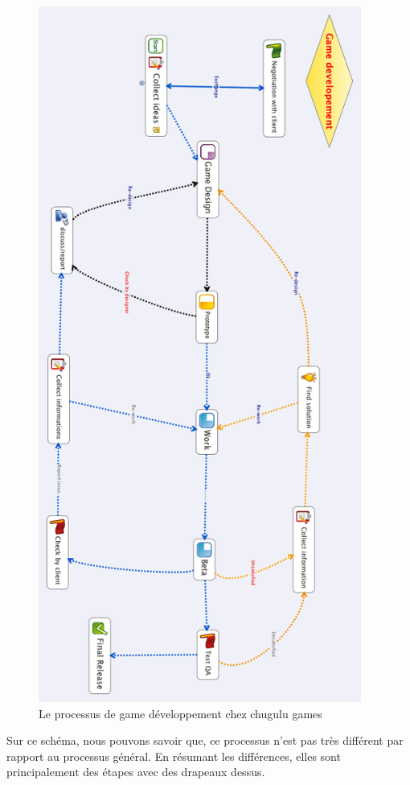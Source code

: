 \begin{figure}[htbp]
	\centering
		\includegraphics[height=9in]{XMinds/GamedevelopementChugulu.png}
	\caption{Le processus de game développement chez chugulu games}
	\label{fig:XMinds_GamedevelopementChugulu}
\end{figure}


Sur ce schéma, nous pouvons savoir que, ce processus n'est pas très différent par rapport au processus général. En résumant les différences, elles sont principalement des étapes avec des drapeaux dessus. 

